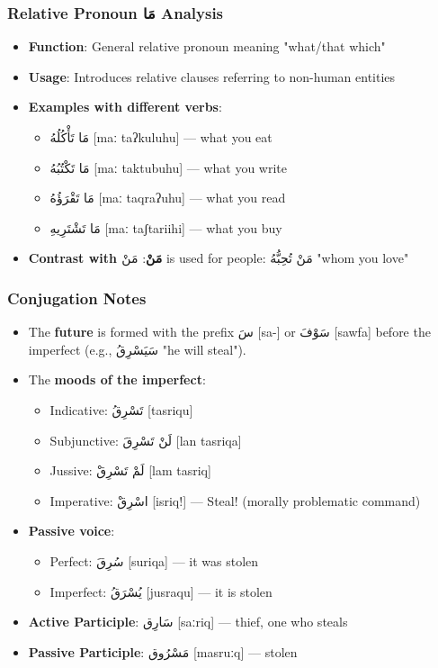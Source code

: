 \documentclass[letterpaper,12pt]{article}
\begin{document}
\subsubsection*{Relative Pronoun \textarabic{مَا} Analysis}
\begin{itemize}
  \item \textbf{Function}: General relative pronoun meaning "what/that which"
  \item \textbf{Usage}: Introduces relative clauses referring to non-human entities
  \item \textbf{Examples with different verbs}:
    \begin{itemize}
      \item \textarabic{مَا تَأْكُلُهُ} [maː taʔkuluhu] — what you eat
      \item \textarabic{مَا تَكْتُبُهُ} [maː taktubuhu] — what you write  
      \item \textarabic{مَا تَقْرَؤُهُ} [maː taqraʔuhu] — what you read
      \item \textarabic{مَا تَشْتَرِيهِ} [maː taʃtariihi] — what you buy
    \end{itemize}
  \item \textbf{Contrast with \textarabic{مَنْ}}: \textarabic{مَنْ} is used for people: \textarabic{مَنْ تُحِبُّهُ} "whom you love"
\end{itemize}

\subsubsection*{Conjugation Notes}
\begin{itemize}
  \item The \textbf{future} is formed with the prefix \textarabic{سَ} [sa-] or \textarabic{سَوْفَ} [sawfa] before the imperfect (e.g., \textarabic{سَيَسْرِقُ} "he will steal").
  \item The \textbf{moods of the imperfect}: 
    \begin{itemize}
      \item Indicative: \textarabic{تَسْرِقُ} [tasriqu] 
      \item Subjunctive: \textarabic{لَنْ تَسْرِقَ} [lan tasriqa]
      \item Jussive: \textarabic{لَمْ تَسْرِقْ} [lam tasriq]
      \item Imperative: \textarabic{اسْرِقْ} [isriq!] — Steal! (morally problematic command)
    \end{itemize}
  \item \textbf{Passive voice}: 
    \begin{itemize}
      \item Perfect: \textarabic{سُرِقَ} [suriqa] — it was stolen
      \item Imperfect: \textarabic{يُسْرَقُ} [jusraqu] — it is stolen
    \end{itemize}
  \item \textbf{Active Participle}: \textarabic{سَارِق} [saːriq] — thief, one who steals
  \item \textbf{Passive Participle}: \textarabic{مَسْرُوق} [masruːq] — stolen
\end{itemize}
\end{document}
